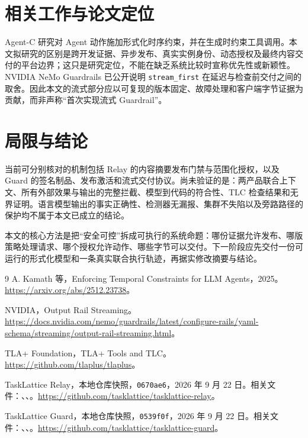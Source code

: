\documentclass[11pt,a4paper]{article}
\theoremstyle{definition}
\newcommand{\code}[1]{\texttt{#1}}
\begin{document}
\section{相关工作与论文定位}

Agent-C 研究对 Agent 动作施加形式化时序约束，并在生成时约束工具调用\cite{kamath2025}。本文拟研究的区别是跨开发证据、异步发布、真实实例身份、动态授权及最终内容交付的平台边界；这只是研究定位，不能在缺乏系统比较时宣称优先性或新颖性。NVIDIA NeMo Guardrails 已公开说明 \code{stream\_first} 在延迟与检查前交付之间的取舍\cite{nvidia}。因此本文的流式部分应以可复现的版本固定、故障处理和客户端字节证据为贡献，而非声称“首次实现流式 Guardrail”。

\section{局限与结论}

当前可分别核对的机制包括 Relay 的内容摘要发布门禁与范围化授权，以及 Guard 的签名制品、发布激活和流式交付协议。尚未验证的是：两产品联合上下文、所有外部效果与输出的完整拦截、模型到代码的符合性、TLC 检查结果和无界证明。语言模型输出的事实正确性、检测器无漏报、集群不失陷以及旁路路径的保护均不属于本文已成立的结论。

本文的核心方法是把“安全可控”拆成可执行的系统命题：哪份证据允许发布、哪版策略处理请求、哪个授权允许动作、哪些字节可以交付。下一阶段应先交付一份可运行的形式化模型和一条真实联合执行轨迹，再据实修改摘要与结论。

\begingroup\raggedright
\begin{thebibliography}{9}
A. Kamath 等，Enforcing Temporal Constraints for LLM Agents，2025。\url{https://arxiv.org/abs/2512.23738}。

NVIDIA，Output Rail Streaming。\url{https://docs.nvidia.com/nemo/guardrails/latest/configure-rails/yaml-schema/streaming/output-rail-streaming.html}。

TLA+ Foundation，TLA+ Tools and TLC。\url{https://github.com/tlaplus/tlaplus}。

TaskLattice Relay，本地仓库快照，\code{0670ae6}，2026 年 9 月 22 日。相关文件：、、。\url{https://github.com/tasklattice/tasklattice-relay}。

TaskLattice Guard，本地仓库快照，\code{0539f0f}，2026 年 9 月 22 日。相关文件：、、。\url{https://github.com/tasklattice/tasklattice-guard}。
\end{thebibliography}
\endgroup
\end{document}

